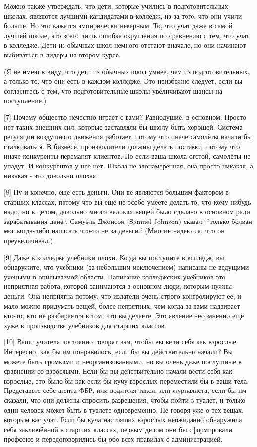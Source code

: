 \documentclass[ebook,12pt,oneside,openany]{memoir}
\begin{document}
Можно также утверждать, что дети, которые учились в подготовительных
школах, являются лучшими кандидатами в колледж, из-за того, что они
учили больше. Но это кажется эмпирически неверным. То, что учат даже в
самой лучшей школе, это всего лишь ошибка округления по сравнению с
тем, что учат в колледже. Дети из обычных школ немного отстают
вначале, но они начинают выбиваться в лидеры на втором курсе. \newline

(Я не имею в виду, что дети из обычных школ умнее, чем из
подготовительных, а только то, что они есть в каждом колледже. Это
неизбежно следует, если вы согласитесь с тем, что подготовительные
школы увеличивают шансы на поступление.) \newline

[7] Почему общество нечестно играет с вами? Равнодушие, в основном.
Просто нет таких внешних сил, которые заставляли бы школу быть
хорошей. Система регуляции воздушного движения работает, потому что
иначе самолёты начали бы сталкиваться. В бизнесе, производители должны
делать поставки, потому что иначе конкуренты переманят клиентов. Но
если ваша школа отстой, самолёты не упадут. И конкурентов у неё нет.
Школа не злонамеренная, она просто никакая, а никакая - это довольно
плохая. \newline

[8] Ну и конечно, ещё есть деньги. Они не являются большим фактором в
старших классах, потому что вы ещё не особо умеете делать то, что
кому-нибудь надо, но в целом, довольно много великих вещей было
сделано в основном ради зарабатывания денег. Самуэль Джонсон (Samuel
Johnson) сказал: ``только болван мог когда-либо написать что-то не за
деньги.`` (Многие надеются, что он преувеличивал.) \newline

[9] Даже в колледже учебники плохи. Когда вы поступите в колледж, вы
обнаружите, что учебники (за небольшим исключением) написаны не
ведущими учёными в описываемой области. Написание колледжских
учебников это неприятная работа, которой занимаются в основном люди,
которым нужны деньги. Она неприятна потому, что издатели очень строго
контролируют её, и мало можно придумать вещей, более непрятных, чем
когда за вами надзирает кто-то, кто не разбирается в том, что вы
делаете. Это явление несомненно ещё хуже в производстве учебников для
старших классов. \newline

[10] Ваши учителя постоянно говорят вам, чтобы вы вели себя как
взрослые. Интересно, как бы им понравилось, если бы вы действительно
начали? Вы можете быть громкими и неорганизованными, но вы очень даже
послушные в сравнении со взрослыми. Если бы вы действительно начали
вести себя как взрослые, это было бы как если бы кучу взрослых
переместили бы в ваши тела. Представьте себе агента ФБР, или водителя
такси, или журналиста, если бы им сказали, что они должны спросить
разрешения, чтобы пойти в туалет, и только один человек может быть в
туалете одновременно. Не говоря уже о тех вещах, которым вас учат.
Если бы куча настоящих взрослых неожиданно обнаружила себя заключённой
в старших классах, первым делом они бы сформировали профсоюз и
передоговорились бы обо всех правилах с администрацией. \newline
\end{document}
